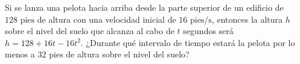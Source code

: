 \item Si se lanza una pelota hacia arriba desde la parte superior de un edificio de $128\text{ pies}$ de altura con una velocidad inicial de $16\text{ pies/s}$, entonces la altura $h$ sobre el nivel del suelo que alcanza al cabo de $t$ segundos será $h = 128 + 16t - 16t^2$. ¿Durante qué intervalo de tiempo estará la pelota por lo menos a $32\text{ pies}$ de altura sobre el nivel del suelo?
